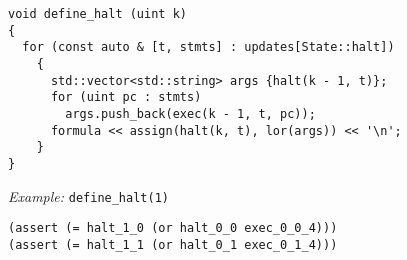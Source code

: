 \begin{lstlisting}[style=c++]
void define_halt (uint k)
{
  for (const auto & [t, stmts] : updates[State::halt])
    {
      std::vector<std::string> args {halt(k - 1, t)};
      for (uint pc : stmts)
        args.push_back(exec(k - 1, t, pc));
      formula << assign(halt(k, t), lor(args)) << '\n';
    }
}
\end{lstlisting}

\noindent
\emph{Example:} \lstinline[style=c++]{define_halt(1)}

\begin{lstlisting}[language=smtlib]
(assert (= halt_1_0 (or halt_0_0 exec_0_0_4)))
(assert (= halt_1_1 (or halt_0_1 exec_0_1_4)))
\end{lstlisting}


